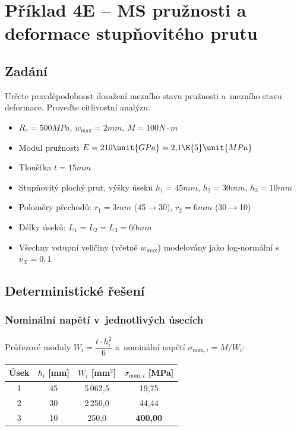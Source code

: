 \section{Příklad 4E -- MS pružnosti a deformace stupňovitého prutu}

\subsection{Zadání}

Určete pravděpodobnost dosažení mezního stavu pružnosti a~mezního stavu deformace. Proveďte citlivostní analýzu.

\begin{itemize}[nosep]
    \item $R_e = 500\unit{MPa}$, $w_{\max} = 2\unit{mm}$, $M = 100\unit{N \cdot m}$
    \item Modul pružnosti $E = 210\unit{GPa} = 2{,}1 \E{5}\unit{MPa}$
    \item Tloušťka $t = 15\unit{mm}$
    \item Stupňovitý plochý prut, výšky úseků $h_1 = 45\unit{mm}$, $h_2 = 30\unit{mm}$, $h_3 = 10\unit{mm}$
    \item Poloměry přechodů: $r_1 = 3\unit{mm}$ (45$\to$30), $r_2 = 6\unit{mm}$ (30$\to$10)
    \item Délky úseků: $L_1 = L_2 = L_3 = 60\unit{mm}$
    \item Všechny vstupní veličiny (včetně $w_{\max}$) modelovány jako log-normální s~$v_X = 0{,}1$
\end{itemize}

\subsection{Deterministické řešení}

\subsubsection{Nominální napětí v~jednotlivých úsecích}

Průřezové moduly $W_i = \dfrac{t \cdot h_i^2}{6}$ a~nominální napětí $\sigma_{\mathrm{nom},i} = M/W_i$:

\begin{table}[H]
\centering
\begin{tabular}{cccc}
\toprule
\textbf{Úsek} & $h_i$ [mm] & $W_i$ [mm$^3$] & $\sigma_{\mathrm{nom},i}$ [MPa] \\
\midrule
1 & 45 & 5\,062{,}5 & 19{,}75 \\
2 & 30 & 2\,250{,}0 & 44{,}44 \\
3 & 10 & 250{,}0 & \textbf{400{,}00} \\
\bottomrule
\end{tabular}
\end{table}

